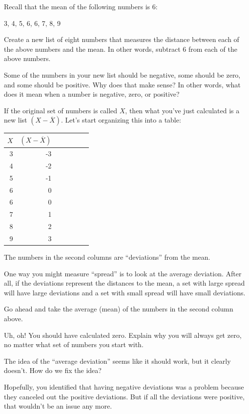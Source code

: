\documentclass[
]{book}
\begin{document}
Recall that the mean of the following numbers is 6:

3, 4, 5, 6, 6, 7, 8, 9

Create a new list of eight numbers that measures the distance between each of the above numbers and the mean. In other words, subtract 6 from each of the above numbers.

Some of the numbers in your new list should be negative, some should be zero, and some should be positive. Why does that make sense? In other words, what does it mean when a number is negative, zero, or positive?

If the original set of numbers is called \(X\), then what you've just calculated is a new list \(\left(X - \overline{X}\right)\). Let's start organizing this into a table:

\begin{longtable}[]{@{}rrll@{}}
\toprule
\(X\) & \(\left(X - \overline{X}\right)\) & \(\qquad\) & \(\quad\) \\
\midrule
\endhead
3 & -3 & & \\
4 & -2 & & \\
5 & -1 & & \\
6 & 0 & & \\
6 & 0 & & \\
7 & 1 & & \\
8 & 2 & & \\
9 & 3 & & \\
\bottomrule
\end{longtable}

The numbers in the second columns are ``deviations'' from the mean.

One way you might measure ``spread'' is to look at the average deviation. After all, if the deviations represent the distances to the mean, a set with large spread will have large deviations and a set with small spread will have small deviations.

Go ahead and take the average (mean) of the numbers in the second column above.

Uh, oh! You should have calculated zero. Explain why you will always get zero, no matter what set of numbers you start with.

The idea of the ``average deviation'' seems like it should work, but it clearly doesn't. How do we fix the idea?

Hopefully, you identified that having negative deviations was a problem because they canceled out the positive deviations. But if all the deviations were positive, that wouldn't be an issue any more.
\end{document}

